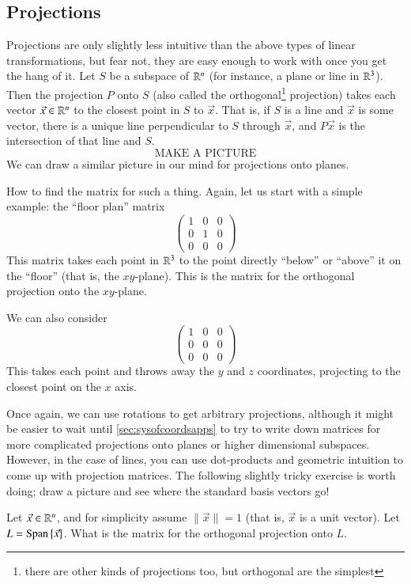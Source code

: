 \subsection{Projections}

Projections are only slightly less intuitive than the above types of linear transformations, but fear not, they are easy enough to work with once you get the hang of it.
Let $S$ be a subspace of $\mathbb{R}^n$ (for instance, a plane or line in $\mathbb{R}^3$).
Then the projection $P$ onto $S$ (also called the orthogonal\footnote{there are other kinds of projections too, but orthogonal are the simplest} projection) takes each vector $\vec{x}\in\mathbb{R}^n$ to the closest point in $S$ to $\vec{x}$.
That is, if $S$ is a line and $\vec{x}$ is some vector, there is a unique line perpendicular to $S$ through $\vec{x}$, and $P\vec{x}$ is the intersection of that line and $S$.
\[\mbox{MAKE A PICTURE}\]
We can draw a similar picture in our mind for projections onto planes.

How to find the matrix for such a thing.
Again, let us start with a simple example: the ``floor plan'' matrix
\[\left(\begin{array}{ccc} 1 & 0 & 0 \\ 0 & 1 & 0 \\ 0 & 0 & 0\end{array}\right)\]
This matrix takes each point in $\mathbb{R}^3$ to the point directly ``below'' or ``above'' it on the ``floor'' (that is, the $xy$-plane).
This is the matrix for the orthogonal projection onto the $xy$-plane.

We can also consider
\[\left(\begin{array}{ccc} 1 & 0 & 0 \\ 0 & 0 & 0 \\ 0 & 0 & 0\end{array}\right)\]
This takes each point and throws away the $y$ and $z$ coordinates, projecting to the closest point on the $x$ axis.

Once again, we can use rotations to get arbitrary projections, although it might be easier to wait until \ref{sec:sysofcoordsapps} to try to write down matrices for more complicated projections onto planes or higher dimensional subspaces.  
However, in the case of lines, you can use dot-products and geometric intuition to come up with projection matrices.
The following slightly tricky exercise is worth doing; draw a picture and see where the standard basis vectors go!
\begin{TrickyEx}
  Let $\vec{x}\in\mathbb{R}^n$, and for simplicity assume $\|\vec{x}\|=1$ (that is, $\vec{x}$ is a unit vector).  
  Let $L=\operatorname{Span}\nolimits\left\{\vec{x}\right\}$.  
  What is the matrix for the orthogonal projection onto $L$.  
\end{TrickyEx}

